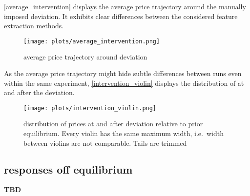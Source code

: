 \autoref{average_intervention} displays the average price trajectory around the manually imposed deviation. It exhibits clear differences between the considered feature extraction methods. 

\begin{figure}
	\texttt{[image: plots/average\_intervention.png]}
	\caption{average price trajectory around deviation}
	\label{average_intervention}
\end{figure}

As the average price trajectory might hide subtle differences between runs even within the same experiment, \autoref{intervention_violin} displays the distribution of at and after the deviation.


\begin{figure}
	\texttt{[image: plots/intervention\_violin.png]}
	\caption{distribution of prices at and after deviation relative to prior equilibrium. Every violin has the same maximum width, i.e.\ width between violins are not comparable. Tails are trimmed}
	\label{intervention_violin}
\end{figure}

\pagebreak
\subsection{responses off equilibrium}

\textbf{TBD}



